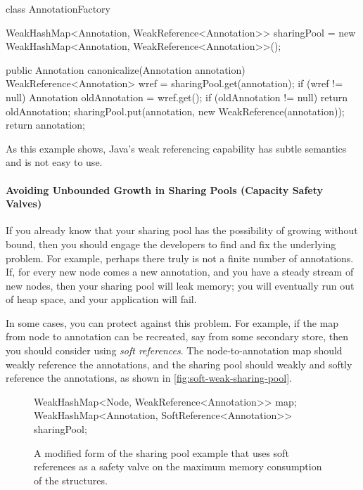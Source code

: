 \begin{figurelisting}
class AnnotationFactory {
   WeakHashMap<Annotation, WeakReference<Annotation>> sharingPool = new WeakHashMap<Annotation, WeakReference<Annotation>>();
    
    public Annotation canonicalize(Annotation annotation) {
        WeakReference<Annotation> wref = sharingPool.get(annotation);
        if (wref != null) {
            Annotation oldAnnotation = wref.get();
            if (oldAnnotation != null) return oldAnnotation;
        }
        sharingPool.put(annotation, new WeakReference(annotation));
        return annotation;
    }
}
\end{figurelisting}

As this example shows,  Java's weak referencing capability has subtle
semantics and is not easy to use.

\paragraph{Avoiding Unbounded Growth in Sharing Pools (Capacity Safety Valves)}
If you already know that your sharing pool has the possibility of growing
without bound, then you should engage the developers to find and fix the
underlying problem. For example, perhaps there truly is not a finite number of
annotations. If, for every new node comes a new annotation, and you have a
steady stream of new nodes, then your sharing pool will leak memory; you will
eventually run out of heap space, and your application will fail.

In some cases, you can protect against this problem. For example, if the map
from node to annotation can be recreated, say from some secondary store, then
you should consider using \emph{soft references}. The node-to-annotation map
should weakly reference the annotations, and the sharing pool
should weakly and softly reference the annotations, as shown in
\autoref{fig:soft-weak-sharing-pool}.

\begin{figure}[h]
\centering
\begin{framedlisting}
WeakHashMap<Node, WeakReference<Annotation>> map;
WeakHashMap<Annotation, SoftReference<Annotation>> sharingPool;
\end{framedlisting}
\caption{A modified form of the sharing pool example that uses soft references
as a safety valve on the maximum memory consumption of the structures.}
\label{fig:soft-weak-sharing-pool}
\end{figure}

